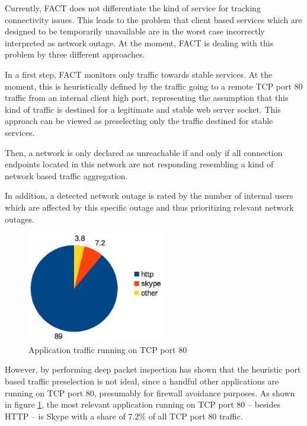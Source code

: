 Currently, \gls{FACT} does not differentiate the kind of service for tracking connectivity issues. This leads to the problem that client based services which are designed to be temporarily unavailable are in the worst case incorrectly interpreted as network outage. At the moment, \gls{FACT} is dealing with this problem by three different approaches.

In a first step, \gls{FACT} monitors only traffic towards stable services. At the moment, this is heuristically defined by the traffic going to a remote \gls{TCP} port 80 traffic from an internal client high port, representing the assumption that this kind of traffic is destined for a legitimate and stable web server socket. This approach can be viewed as preselecting only the traffic destined for stable services.  

Then, a network is only declared as unreachable if and only if all connection endpoints located in this network are not responding resembling a kind of network based traffic aggregation. 

In addition, a detected network outage is rated by the number of internal users which are affected by this specific outage and thus prioritizing relevant network outages.

\begin{figure}
	[ht] \centering
	\includegraphics[width=6cm]{images/application_fact_port_80.eps}
	\caption{Application traffic running on TCP port 80 \citep{SchatzmanThesis2012}} 
	\label{fig:tcp_port80}
\end{figure}

However, by performing deep packet inspection \citet{SchatzmanThesis2012} has shown that the heuristic port based traffic preselection is not ideal, since a handful other applications are running on \gls{TCP}  port 80, presumably for firewall avoidance purposes. As shown in figure \ref{fig:tcp_port80}, the most relevant application running on \gls{TCP} port 80 -- besides \gls{HTTP} -- is Skype with a share of $7.2\%$ of all \gls{TCP} port 80 traffic. 

